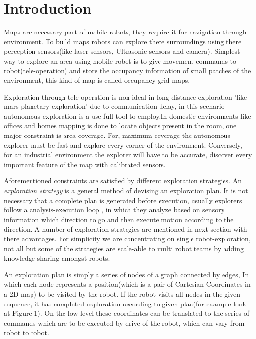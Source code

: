 \section{Introduction}
\label{sec:intro}
Maps are necessary part of mobile robots, they require it for navigation through environment. To
build maps robots can explore there surroundings using there perception sensors(like laser sensors,
Ultrasonic sensors and camera). Simplest way to explore an area using mobile robot is to give
movement commands to robot(tele-operation) and store the occupancy information of small patches of
the environment, this kind of map is called occupancy grid maps. \par

Exploration through tele-operation is non-ideal in long distance exploration 'like mars planetary
exploration' due to communication delay, in this scenario autonomous exploration is a use-full tool
to employ.In domestic environments like offices and homes mapping is done to locate objects present
in the room, one major constraint is area coverage. For, maximum coverage the autonomous explorer
must be fast and explore every corner of the environment. Conversely, for an industrial environment
the explorer will have to be accurate, discover every important feature of the map with calibrated
sensors. \par

Aforementioned constraints are satisfied by different exploration strategies. An \textit{exploration
strategy} is a general method of devising an exploration plan. It is not necessary that a complete
plan is generated before execution, usually explorers follow a analysis-execution loop , in which
they analyze based on sensory information which direction to go and then execute motion according to
the direction. A number of exploration strategies are mentioned in next section with there
advantages. For simplicity we are concentrating on single robot-exploration, not all but some of the
strategies are scale-able to multi robot teams by adding knowledge sharing amongst robots. \par

An exploration plan is simply a series of nodes of a graph connected by edges, In which each node
represents a position(which is a pair of Cartesian-Coordinates in a 2D map) to be visited by the
robot. If the robot visits all nodes in the given sequence, it has completed exploration according
to given plan(for example look at Figure 1). On the low-level these coordinates can be translated to
the series of commands which are to be executed by drive of the robot, which can vary from robot to
robot. \par

